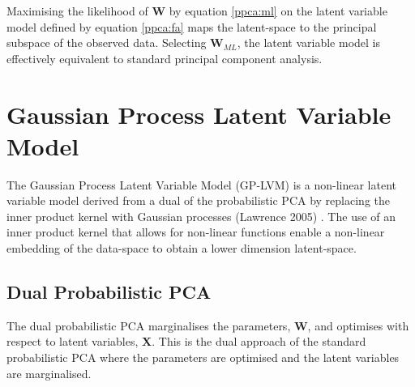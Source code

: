 \documentclass[ %
                    author={Dillon Keith Diep [INCOMPLETE DRAFT, NOT FOR SUBMISSION]},
                supervisor={Dr. Carl Henrik Ek},
                    degree={MEng},
                     title={ARt-CG:},
                  subtitle={Assisted Real-time Content Generation of 3D Hair by Learning Manifolds},
                      type={Research},
                      year={2014} ]{dissertation}
\begin{document}
Maximising the likelihood of $\mathbf{W}$ by equation \ref{ppca:ml} on the latent variable model defined by equation \ref{ppca:fa} maps the latent-space to the principal subspace of the observed data. Selecting $\mathbf{W}_{ML}$, the latent variable model is effectively equivalent to standard principal component analysis.

\section{Gaussian Process Latent Variable Model}
The Gaussian Process Latent Variable Model (GP-LVM) is a non-linear latent variable model derived from a dual of the probabilistic PCA by replacing the inner product kernel with Gaussian processes (Lawrence 2005) \cite{gplvm}. The use of an inner product kernel that allows for non-linear functions enable a non-linear embedding of the data-space to obtain a lower dimension latent-space. 

\subsection{Dual Probabilistic PCA}
The dual probabilistic PCA marginalises the parameters, $\mathbf{W}$, and optimises with respect to latent variables, $\mathbf{X}$. This is the dual approach of the standard probabilistic PCA where the parameters are optimised and the latent variables are marginalised.
\end{document}
